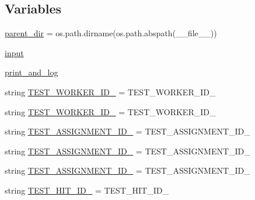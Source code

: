 \subsection*{Variables}
\begin{DoxyCompactItemize}
\item 
\hyperlink{namespaceparlai_1_1mturk_1_1core_1_1test_1_1test__full__system_accc456484e6dac9c6df29b3a51be51eb}{parent\+\_\+dir} = os.\+path.\+dirname(os.\+path.\+abspath(\+\_\+\+\_\+file\+\_\+\+\_\+))
\item 
\hyperlink{namespaceparlai_1_1mturk_1_1core_1_1test_1_1test__full__system_a9c6a0f63bd8032646c03ba403ecabf15}{input}
\item 
\hyperlink{namespaceparlai_1_1mturk_1_1core_1_1test_1_1test__full__system_a1effa9a01ea3b85365c1b05d845e0628}{print\+\_\+and\+\_\+log}
\item 
string \hyperlink{namespaceparlai_1_1mturk_1_1core_1_1test_1_1test__full__system_a6c4de8873a9cfd06a1c1b77ff3e79b0a}{T\+E\+S\+T\+\_\+\+W\+O\+R\+K\+E\+R\+\_\+\+I\+D\+\_} = \textquotesingle{}T\+E\+S\+T\+\_\+\+W\+O\+R\+K\+E\+R\+\_\+\+I\+D\+\_\textquotesingle{}
\item 
string \hyperlink{namespaceparlai_1_1mturk_1_1core_1_1test_1_1test__full__system_a04db3571153c81d1ca925de29ddf1eff}{T\+E\+S\+T\+\_\+\+W\+O\+R\+K\+E\+R\+\_\+\+I\+D\+\_} = \textquotesingle{}T\+E\+S\+T\+\_\+\+W\+O\+R\+K\+E\+R\+\_\+\+I\+D\+\_\textquotesingle{}
\item 
string \hyperlink{namespaceparlai_1_1mturk_1_1core_1_1test_1_1test__full__system_a93d64cf06c78449caaa85cb458467635}{T\+E\+S\+T\+\_\+\+A\+S\+S\+I\+G\+N\+M\+E\+N\+T\+\_\+\+I\+D\+\_} = \textquotesingle{}T\+E\+S\+T\+\_\+\+A\+S\+S\+I\+G\+N\+M\+E\+N\+T\+\_\+\+I\+D\+\_\textquotesingle{}
\item 
string \hyperlink{namespaceparlai_1_1mturk_1_1core_1_1test_1_1test__full__system_a5bc4351532510e41f89962df507b9c2f}{T\+E\+S\+T\+\_\+\+A\+S\+S\+I\+G\+N\+M\+E\+N\+T\+\_\+\+I\+D\+\_} = \textquotesingle{}T\+E\+S\+T\+\_\+\+A\+S\+S\+I\+G\+N\+M\+E\+N\+T\+\_\+\+I\+D\+\_\textquotesingle{}
\item 
string \hyperlink{namespaceparlai_1_1mturk_1_1core_1_1test_1_1test__full__system_a2e32934beee3b3b76871e30549486bcb}{T\+E\+S\+T\+\_\+\+A\+S\+S\+I\+G\+N\+M\+E\+N\+T\+\_\+\+I\+D\+\_} = \textquotesingle{}T\+E\+S\+T\+\_\+\+A\+S\+S\+I\+G\+N\+M\+E\+N\+T\+\_\+\+I\+D\+\_\textquotesingle{}
\item 
string \hyperlink{namespaceparlai_1_1mturk_1_1core_1_1test_1_1test__full__system_a7e2e0089fe5cc6a506f1cbbe9ae57c2f}{T\+E\+S\+T\+\_\+\+H\+I\+T\+\_\+\+I\+D\+\_} = \textquotesingle{}T\+E\+S\+T\+\_\+\+H\+I\+T\+\_\+\+I\+D\+\_\textquotesingle{}

\end{DoxyCompactItemize}
